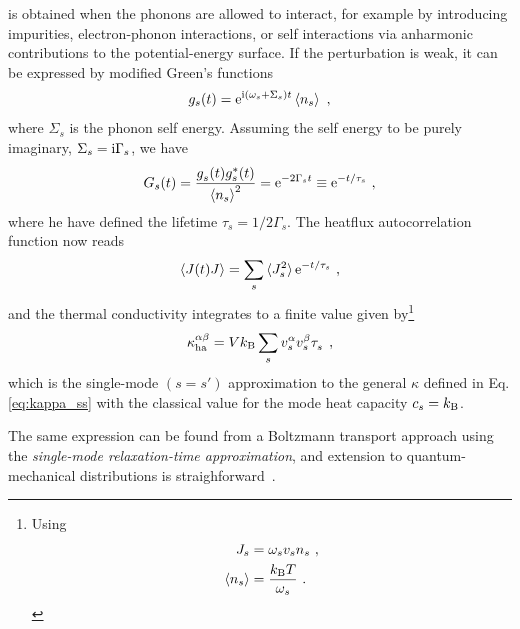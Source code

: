  is obtained when the phonons are allowed to interact, for example by introducing impurities, electron-phonon interactions, or self interactions via anharmonic contributions to the potential-energy surface. If the perturbation is weak, it can be expressed by modified Green's functions~\cite{NegeleOrland}
\begin{align}
	g_s (t) = {\rm e}^{\im \left( \omega_s + \Sigma_s \right) t} \braket{n_s}~,
	\label{eq:ha.kappa.g.self}
\end{align}
where $\Sigma_s$ is the phonon self energy. Assuming the self energy to be purely imaginary, $\Sigma_s = {\rm i} \Gamma_s$, we have
\begin{align}
	G_{s} (t) = \frac{\fD g_s (t) g^\ast_{s} (t)}{\braket{n_s}^2} = {\rm e}^{- 2 \Gamma_s t}
	\equiv {\rm e}^{-t / \tau_s} ~,
	\label{eq:ha.kappa.gg.Sigma}
\end{align}
where he have defined the lifetime $\tau_s = 1 / 2 \Gamma_s$. The heatflux autocorrelation function now reads
\begin{align}
	\braket{J (t) J} = \sum_s \braket{J_s^2} {\rm e}^{-t / \tau_s}~,
	\label{eq:ha.kappa.JJ.pert}
\end{align}
and the thermal conductivity integrates to a finite value given by\footnote{Using \begin{align*}
		J_s 
			&= \omega_s v_s n_s~,\\
		\braket{n_s} 
			&= \frac{k_{\rm B} T}{\omega_s}~.
	\end{align*}}
\begin{align}
	\kappa_{\rm ha}^{\alpha \beta} = V k_{\rm B} \sum_{s} v^\alpha_s v^{\beta \vphantom{\dagger}}_s \fD \tau_s~,
	\label{eq:ha.kappa.bte}
\end{align}
which is the single-mode $(s=s')$ approximation to the general $\kappa$ defined in Eq.\,\eqref{eq:kappa_ss} with the classical value for the mode heat capacity $c_s = k_{\rm B}$.

The same expression can be found from a Boltzmann transport approach using the \emph{single-mode relaxation-time approximation}, and extension to quantum-mechanical distributions is straighforward~\cite{Srivastava}.

